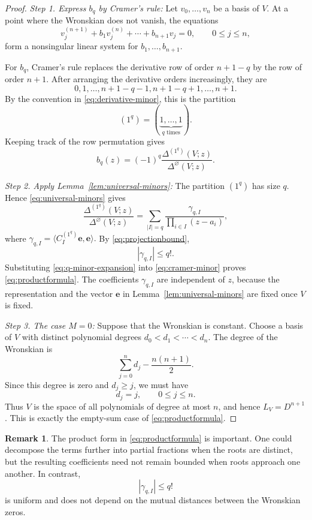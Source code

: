 \documentclass[12pt,letterpaper,reqno]{amsart}
\theoremstyle{definition}
\newtheorem{rem}[thm]{Remark}
\numberwithin{equation}{section}
\newcommand{\ev}{\bm  e}
\begin{document}
\begin{proof}

\medskip\noindent
\emph{{Step 1. Express \(b_q\) by Cramer's rule:}}
Let \(v_0,\ldots,v_{n}\) be a basis of \(V\). At a point where the
Wronskian does not vanish, the equations
\[
v_j^{(n+1)}
+
b_1v_j^{(n)}
+\cdots+
b_{n+1}v_j
=0,
\qquad
0\leq j\leq n,
\]
form a nonsingular linear system for
\(b_1,\ldots,b_{n+1}\).

For \(b_q\), Cramer's rule replaces the derivative row of order
\({n+1}-q\) by the row of order \({n+1}\). After arranging the derivative
orders increasingly, they are
\[
0,1,\ldots,{n+1}-q-1,
{n+1}-q+1,\ldots,{n+1}.
\]
By the convention in \eqref{eq:derivative-minor}, this is the
partition
\[
(1^q)
=
(\underbrace{1,\ldots,1}_{q\text{ times}}).
\]
Keeping track of the row permutation gives
\begin{equation}\label{eq:cramer-minor}
 b_q(z)
 =
 (-1)^q
 \frac{\Delta^{(1^q)}(V;z)}
      {\Delta^\varnothing(V;z)}.
\end{equation}

\medskip\noindent
\emph{{Step 2. Apply Lemma~\ref{lem:universal-minors}:}}
The partition \((1^q)\) has size \(q\). Hence
\eqref{eq:universal-minors} gives
\begin{equation}\label{eq:q-minor-expansion}
\frac{\Delta^{(1^q)}(V;z)}
     {\Delta^\varnothing(V;z)}
=
\sum_{|I|=q}
\frac{\gamma_{q,I}}
     {\prod_{i\in I}(z-a_i)},
\end{equation}
where
$
\gamma_{q,I}
=
\langle C_I^{(1^q)}\ev,\ev\rangle.
$
By \eqref{eq:projectionbound},
\[
|\gamma_{q,I}|\leq q!.
\]
Substituting \eqref{eq:q-minor-expansion} into
\eqref{eq:cramer-minor} proves \eqref{eq:productformula}. The coefficients \(\gamma_{q,I}\) are
independent of \(z\), because the representation and the vector
\(\ev\) in Lemma~\ref{lem:universal-minors} are fixed once \(V\) is
fixed.

\medskip\noindent
\emph{{Step 3. The case \(M=0\):}}
Suppose that the Wronskian is constant. Choose a basis of \(V\) with
distinct polynomial degrees
$
d_0<d_1<\cdots<d_{n}.
$
The degree of the Wronskian is
\[
\sum_{j=0}^{n}d_j-\frac{n(n+1)}2.
\]
Since this degree is zero and \(d_j\geq j\), we must have
\[
d_j=j,
\qquad
0\leq j\leq n.
\]
Thus \(V\) is the space of all polynomials of degree at most \(n\),
and hence \(L_V=D^{n+1}\).
This is exactly the empty-sum case of \eqref{eq:productformula}.
\end{proof}

\begin{rem}\label{rem:product-form}
The product form in \eqref{eq:productformula} is important. One could
decompose the terms further into partial fractions when the roots are
distinct, but the resulting coefficients need not remain bounded when
roots approach one another. In contrast,
\[
|\gamma_{q,I}|\leq q!
\]
is uniform and does not depend on the mutual distances between the
Wronskian zeros.
\end{rem}
\end{document}
